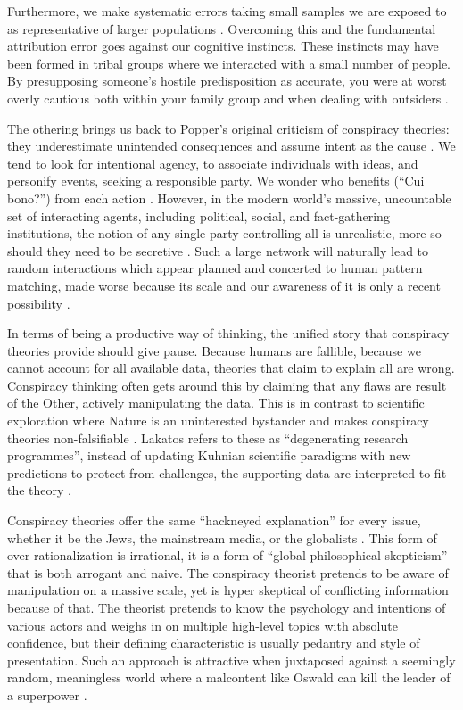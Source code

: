 Furthermore, we make systematic errors taking small samples we are exposed to as representative of larger populations \cite{kahneman1982}.
Overcoming this and the fundamental attribution error goes against our cognitive instincts.
These instincts may have been formed in tribal groups where we interacted with a small number of people.
By presupposing someone's hostile predisposition as accurate, you were at worst overly cautious both within your family group and when dealing with outsiders \cite[pp. 146-147]{clarke2002}.

The othering brings us back to Popper's original criticism of conspiracy theories: they underestimate unintended consequences and assume intent as the cause \cite{popper2014}.
We tend to look for intentional agency, to associate individuals with ideas, and personify events, seeking a responsible party.
We wonder who benefits (``Cui bono?'') from each action \cite{graumann2012}.
However, in the modern world's massive, uncountable set of interacting agents, including political, social, and fact-gathering institutions, the notion of any single party controlling all is unrealistic, more so should they need to be secretive \cite{clarke2002}.
Such a large network will naturally lead to random interactions which appear planned and concerted to human pattern matching, made worse because its scale and our awareness of it is only a recent possibility \cite{taleb2008}.

In terms of being a productive way of thinking, the unified story that conspiracy theories provide should give pause.
Because humans are fallible, because we cannot account for all available data, theories that claim to explain all are wrong.
Conspiracy thinking often gets around this by claiming that any flaws are result of the Other, actively manipulating the data.
This is in contrast to scientific exploration where Nature is an uninterested bystander and makes conspiracy theories non-falsifiable \cite[pp. 120-121]{keeley1999}.
Lakatos refers to these as ``degenerating research programmes'', instead of updating Kuhnian scientific paradigms with new predictions to protect from challenges, the supporting data are interpreted to fit the theory \cite{lakatos1976}.

Conspiracy theories offer the same ``hackneyed explanation'' for every issue, whether it be the Jews, the mainstream media, or the globalists \cite[p. 741]{goertzel1994}.
This form of over rationalization is irrational, it is a form of ``global philosophical skepticism'' that is both arrogant and naive.
The conspiracy theorist pretends to be aware of manipulation on a massive scale, yet is hyper skeptical of conflicting information because of that.
The theorist pretends to know the psychology and intentions of various actors and weighs in on multiple high-level topics with absolute confidence, but their defining characteristic is usually pedantry and style of presentation.
Such an approach is attractive when juxtaposed against a seemingly random, meaningless world where a malcontent like Oswald can kill the leader of a superpower \cite[p. 120]{keeley1999}.

